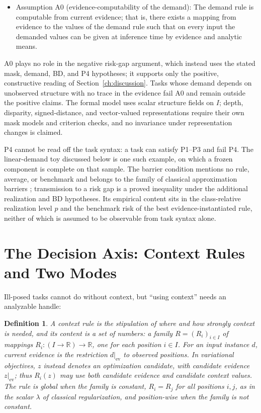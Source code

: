 \documentclass[twoside,11pt]{article}
\newtheorem{defn}{Definition}
\newcommand{\ev}{\mathrm{ev}}
\begin{document}
\begin{itemize}
\item Assumption A0 (evidence-computability of the demand): The demand rule is computable from current evidence; that is, there exists a mapping from evidence to the values of the demand rule such that on every input the demanded values can be given at inference time by evidence and analytic means.
\end{itemize}

A0 plays no role in the negative risk-gap argument, which instead uses the stated mask, demand, BD, and P4 hypotheses; it supports only the positive, constructive reading of Section~\ref{ch:discussion}. Tasks whose demand depends on unobserved structure with no trace in the evidence fail A0 and remain outside the positive claims. The formal model uses scalar structure fields on $I$; depth, disparity, signed-distance, and vector-valued representations require their own mask models and criterion checks, and no invariance under representation changes is claimed.

P4 cannot be read off the task syntax: a task can satisfy P1--P3 and fail P4. The linear-demand toy discussed below is one such example, on which a frozen component is complete on that sample. The barrier condition mentions no rule, average, or benchmark and belongs to the family of classical approximation barriers \citep{kolmogorov1936,pinkus1985}; transmission to a risk gap is a proved inequality under the additional realization and BD hypotheses. Its empirical content sits in the class-relative realization level $p$ and the benchmark risk of the best evidence-instantiated rule, neither of which is assumed to be observable from task syntax alone.

\section{The Decision Axis: Context Rules and Two Modes}
\label{ch:axis}

Ill-posed tasks cannot do without context, but ``using context'' needs an analyzable handle:

\begin{defn}
A \emph{context rule} is the stipulation of where and how strongly context is needed, and its content is a set of numbers: a family $R = (R_i)_{i \in I}$ of mappings $R_i : (I \to \mathbb{R}) \to \mathbb{R}$, one for each position $i \in I$. For an input instance $d$, current evidence is the restriction $d|_{\ev}$ to observed positions. In variational objectives, $z$ instead denotes an optimization candidate, with candidate evidence $z|_{\ev}$; thus $R_i(z)$ may use both candidate evidence and candidate context values. The rule is \emph{global} when the family is constant, $R_i = R_j$ for all positions $i, j$, as in the scalar $\lambda$ of classical regularization, and \emph{position-wise} when the family is not constant.
\end{defn}
\end{document}
